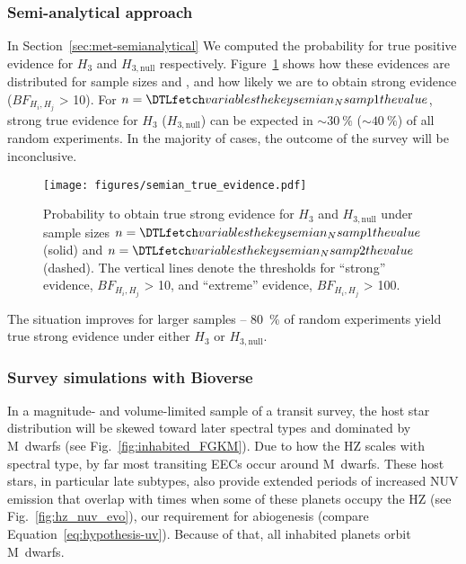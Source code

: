 \documentclass[modern,linenumbers]{aastex631}
\begin{document}
\subsubsection{Semi-analytical approach}
In Section~\ref{sec:met-semianalytical} We computed the probability for true positive evidence for $H_\mathrm{3}$ and $H_\mathrm{3, null}$ respectively.
Figure~\ref{fig:semian_true_evidence} shows how these evidences are distributed for sample sizes  and , and how likely we are to obtain strong evidence ($BF_{H_i, H_j}$ > 10).
For $n = \var{semian_Nsamp1}$, strong true evidence for $H_\mathrm{3}$ ($H_\mathrm{3, null}$) can be expected in $\sim \SI{30}{\percent}$ ($\sim \SI{40}{\percent}$) of all random experiments.
In the majority of cases, the outcome of the survey will be inconclusive.
\begin{figure}
    \begin{centering}
        \texttt{[image: figures/semian\_true\_evidence.pdf]}
        \caption{Probability to obtain true strong evidence for $H_\mathrm{3}$ and $H_\mathrm{3, null}$ under sample sizes $n = \var{semian_Nsamp1}$ (solid) and $n = \var{semian_Nsamp2}$ (dashed). The vertical lines denote the thresholds for ``strong'' evidence, $BF_{H_i, H_j}$ > 10, and ``extreme'' evidence, $BF_{H_i, H_j}$ > 100.}
        \label{fig:semian_true_evidence}
    \end{centering}
\end{figure}
The situation improves for larger samples -- \SI{80}{\percent} of random experiments yield true strong evidence under either $H_\mathrm{3}$ or $H_\mathrm{3, null}$.








\subsubsection{Survey simulations with Bioverse}

In a magnitude- and volume-limited sample of a transit survey, the host star distribution will be skewed toward later spectral types and dominated by M~dwarfs (see Fig.~\ref{fig:inhabited_FGKM}).
Due to how the \gls{HZ} scales with spectral type, by far most transiting \glspl{EEC} occur around M~dwarfs.
These host stars, in particular late subtypes, also provide extended periods of increased \gls{NUV} emission that overlap with times when some of these planets occupy the \gls{HZ} (see Fig.~\ref{fig:hz_nuv_evo}), our requirement for abiogenesis (compare Equation~\ref{eq:hypothesis-uv}).
Because of that, all inhabited planets orbit M~dwarfs.
\end{document}
